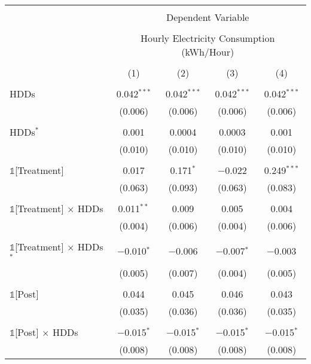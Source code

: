 
\begin{table}[!htbp] \centering 
  \label{Table:Breakdown-of-Average-Treatement-Effects_By-Tariff_17-to-18} 
\scriptsize
\begin{tabular}{@{\extracolsep{30pt}}lcccc} 
\\[-1.8ex]\hline 
\hline \\[-1.8ex] 
 & \multicolumn{4}{c}{Dependent Variable} \\ 
\cline{2-5} 
\\[-1.8ex] & \multicolumn{4}{c}{Hourly Electricity Consumption  (kWh/Hour)} \\ 
\\[-1.8ex] & (1) & (2) & (3) & (4)\\ 
\hline \\[-1.8ex] 
 HDDs & 0.042$^{***}$ & 0.042$^{***}$ & 0.042$^{***}$ & 0.042$^{***}$ \\ 
  & (0.006) & (0.006) & (0.006) & (0.006) \\ 
  & & & & \\ 
 HDDs$^{*}$ & 0.001 & 0.0004 & 0.0003 & 0.001 \\ 
  & (0.010) & (0.010) & (0.010) & (0.010) \\ 
  & & & & \\ 
 $\mathbb{1}$[Treatment] & 0.017 & 0.171$^{*}$ & $-$0.022 & 0.249$^{***}$ \\ 
  & (0.063) & (0.093) & (0.063) & (0.083) \\ 
  & & & & \\ 
 $\mathbb{1}$[Treatment] $\times$ HDDs & 0.011$^{**}$ & 0.009 & 0.005 & 0.004 \\ 
  & (0.004) & (0.006) & (0.004) & (0.006) \\ 
  & & & & \\ 
 $\mathbb{1}$[Treatment] $\times$ HDDs$^{*}$ & $-$0.010$^{*}$ & $-$0.006 & $-$0.007$^{*}$ & $-$0.003 \\ 
  & (0.005) & (0.007) & (0.004) & (0.005) \\ 
  & & & & \\ 
 $\mathbb{1}$[Post] & 0.044 & 0.045 & 0.046 & 0.043 \\ 
  & (0.035) & (0.036) & (0.036) & (0.035) \\ 
  & & & & \\ 
 $\mathbb{1}$[Post] $\times$ HDDs & $-$0.015$^{*}$ & $-$0.015$^{*}$ & $-$0.015$^{*}$ & $-$0.015$^{*}$ \\ 
  & (0.008) & (0.008) & (0.008) & (0.008) \\ 

\end{tabular}
\end{table}
